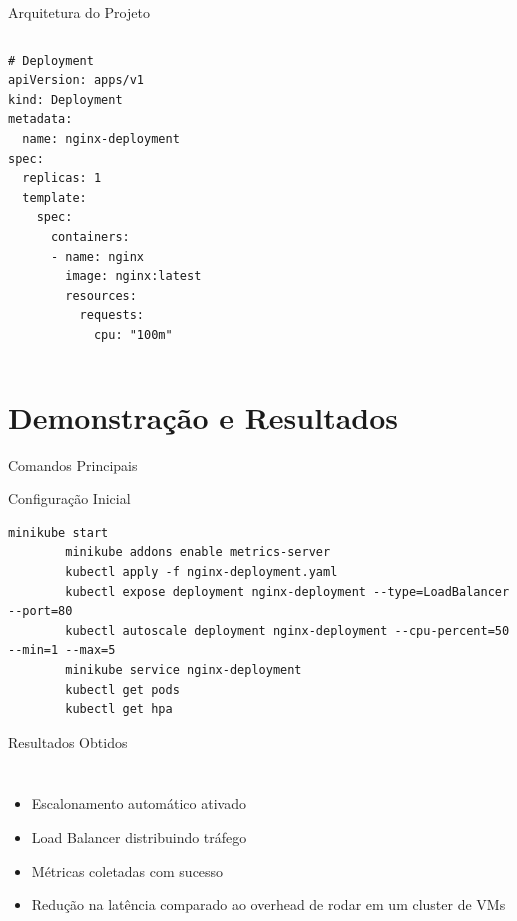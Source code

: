\documentclass{beamer}
\begin{document}
\begin{frame}[fragile]{Arquitetura do Projeto}
    \begin{columns}
        \begin{lstlisting}
# Deployment
apiVersion: apps/v1
kind: Deployment
metadata:
  name: nginx-deployment
spec:
  replicas: 1
  template:
    spec:
      containers:
      - name: nginx
        image: nginx:latest
        resources:
          requests:
            cpu: "100m"
        \end{lstlisting}

    \end{columns}
\end{frame}

\section{Demonstração e Resultados}
\begin{frame}[fragile]{Comandos Principais}
    \begin{exampleblock}{Configuração Inicial}
        \begin{lstlisting}[basicstyle=\scriptsize]
        minikube start
        minikube addons enable metrics-server
        kubectl apply -f nginx-deployment.yaml
        kubectl expose deployment nginx-deployment --type=LoadBalancer --port=80
        kubectl autoscale deployment nginx-deployment --cpu-percent=50 --min=1 --max=5
        minikube service nginx-deployment
        kubectl get pods
        kubectl get hpa
        \end{lstlisting}
    \end{exampleblock}
\end{frame}

\begin{frame}{Resultados Obtidos}
    \begin{columns}
        \begin{itemize}
            \item Escalonamento automático ativado
            \item Load Balancer distribuindo tráfego
            \item Métricas coletadas com sucesso
            \item Redução na latência comparado ao overhead de rodar em um cluster de VMs
        \end{itemize}
   \end{columns}
\end{frame}
\end{document}

